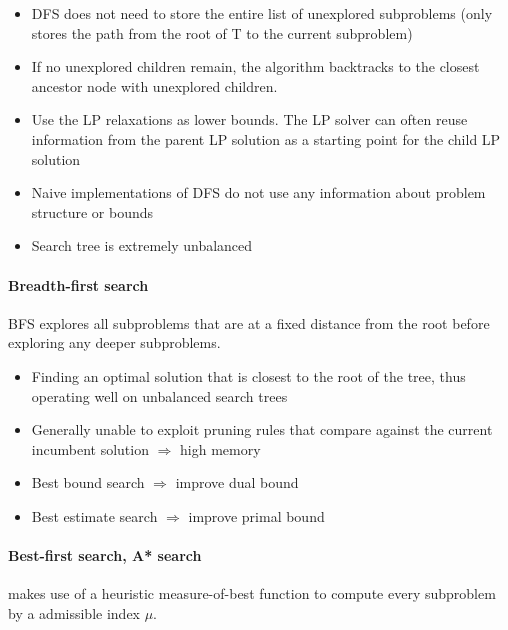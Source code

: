                 \begin{itemize}
                    \item DFS does not need to store the entire list of unexplored subproblems (only stores the path from the root of T to the current subproblem)
                    \item If no unexplored children remain, the algorithm backtracks to the closest ancestor node with unexplored children.
                    \item Use the LP relaxations as lower bounds. The LP solver can often reuse information from the parent LP solution as a starting point for the child LP solution
                    \item Naive implementations of DFS do not use any information about problem structure or bounds
                    \item Search tree is extremely unbalanced
                \end{itemize}

            \paragraph{Breadth-first search}
                BFS explores all subproblems that are at a fixed distance from the root before exploring any deeper subproblems.

                \begin{itemize}
                    \item Finding an optimal solution that is closest to the root of the tree, thus operating well on unbalanced search trees
                    \item Generally unable to exploit pruning rules that compare against the current incumbent solution $\Rightarrow$ high memory
                    \item Best bound search $\Rightarrow$ improve dual bound
                    \item Best estimate search $\Rightarrow$ improve primal bound
                \end{itemize}

            \paragraph{Best-first search, A* search}
                makes use of a heuristic measure-of-best function to compute every subproblem by a admissible index $\mu$.

